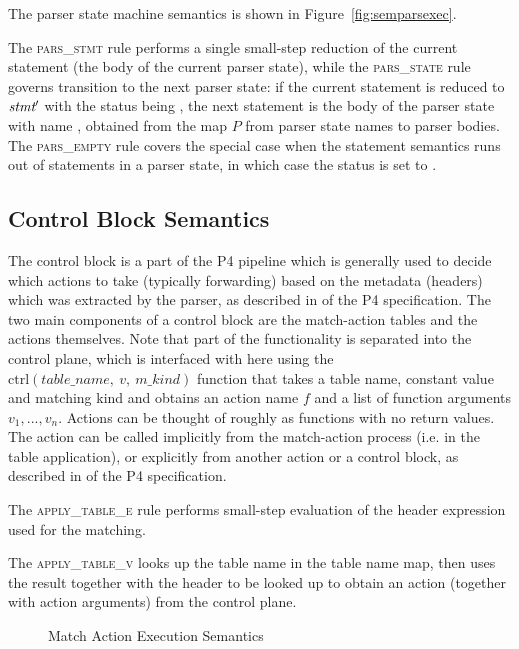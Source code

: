 \documentclass[UTF8]{article}
\begin{document}
The parser state machine semantics is shown in Figure~\ref{fig:semparsexec}.

The \textsc{pars\_stmt} rule performs a single small-step reduction of the current statement (the body of the current parser state), while the \textsc{pars\_state} rule governs transition to the next parser state: if the current statement \stmt{} is reduced to $\textit{stmt}{}'$ with the status being \trans{\vn{}}, the next statement is the body of the parser state with name \vn{}, obtained from the map $P$ from parser state names to parser bodies. The \textsc{pars\_empty} rule covers the special case when the statement semantics runs out of statements in a parser state, in which case the status is set to .

\subsection{Control Block Semantics}
The control block is a part of the P4 pipeline which is generally used to decide which actions to take (typically forwarding) based on the metadata (headers) which was extracted by the parser, as described in  of the P4 specification. The two main components of a control block are the match-action tables and the actions themselves. Note that part of the functionality is separated into the control plane, which is interfaced with here using the $\mathrm{ctrl}(table\_name,\ v,\ m\_kind)$ function that takes a table name, constant value and matching kind and obtains an action name $f$ and a list of function arguments ${v_1}, ..., {v_n}$.
Actions can be thought of roughly as functions with no return values. The action can be called implicitly from the match-action process (i.e. in the table application), or explicitly from another action or a control block, as described in  of the P4 specification.

The \textsc{apply\_table\_e} rule performs small-step evaluation of the header expression used for the matching.

The \textsc{apply\_table\_v} looks up the table name in the table name map, then uses the result together with the header to be looked up to obtain an action (together with action arguments) from the control plane.

\begin{figure}[ht!]
\ottusedrule{\ottdrulestmtXXapplyXXtableXXe{}}
\ottusedrule{\ottdrulestmtXXapplyXXtableXXv{}}
\caption{Match Action Execution Semantics}
\label{fig:semmatchaction}
\end{figure}
\end{document}
